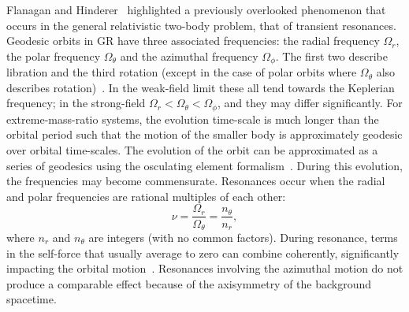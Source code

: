 \documentclass[aps,prd,amsfonts,amssymb,amsmath,nofootinbib,reprint,showpacs]{revtex4}
\begin{document}
Flanagan and Hinderer~\cite{Flanagan2012} highlighted a previously overlooked phenomenon that occurs in the general relativistic two-body problem, that of transient resonances. Geodesic orbits in GR have three associated frequencies: the radial frequency $\Omega_r$, the polar frequency $\Omega_\theta$ and the azimuthal frequency $\Omega_\phi$. The first two describe libration and the third rotation (except in the case of polar orbits where $\Omega_\theta$ also describes rotation)~\cite{Goldstein2002}. %
In the weak-field limit these all tend towards the Keplerian frequency; in the strong-field $\Omega_r < \Omega_\theta < \Omega_\phi$, and they may differ significantly. For extreme-mass-ratio systems, the evolution time-scale is much longer than the orbital period such that the motion of the smaller body is approximately geodesic over orbital time-scales. The evolution of the orbit can be approximated as a series of geodesics using the osculating element formalism~\cite{Pound2008,Gair2011a}. During this evolution, the frequencies may become commensurate. Resonances occur when the radial and polar frequencies are rational multiples of each other:
\begin{equation}
\nu = \frac{\Omega_r}{\Omega_\theta} = \frac{n_\theta}{n_r},
\end{equation}
where $n_r$ and $n_\theta$ are integers (with no common factors). During resonance, terms in the self-force that usually average to zero can combine coherently, significantly impacting the orbital motion~\cite{Flanagan2012a}. Resonances involving the azimuthal motion do not produce a comparable effect because of the axisymmetry of the background spacetime.
\end{document}
